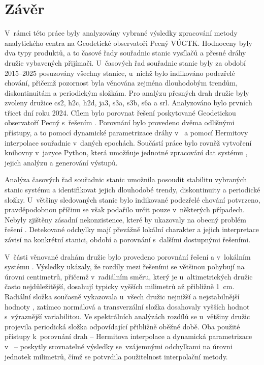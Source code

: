 \chapter{Závěr}
\label{8-zaver}

V~rámci této práce byly analyzovány vybrané výsledky zpracování metody  analytického centra na Geodetické observatoři Pecný VÚGTK. Hodnoceny byly dva typy produktů, a to časové řady souřadnic stanic vysílačů a přesné dráhy družic vybavených přijímači. U~časových řad souřadnic stanic byly za období 2015--2025 posuzovány všechny stanice, u~nichž bylo indikováno podezřelé chování, přičemž pozornost byla věnována zejména dlouhodobým trendům, diskontinuitám a periodickým složkám. Pro analýzu přesných drah družic byly zvoleny družice cs2, h2c, h2d, ja3, s3a, s3b, s6a a srl. Analyzováno bylo prvních třicet dní roku 2024. Cílem bylo porovnat řešení poskytované Geodetickou observatoří Pecný s~řešením . Porovnání bylo provedeno dvěma odlišnými přístupy, a to pomocí dynamické parametrizace dráhy v~ a pomocí Hermitovy interpolace souřadnic v~daných epochách. Součástí práce bylo rovněž vytvoření knihovny v~jazyce Python, která umožňuje jednotné zpracování dat systému , jejich analýzu a generování výstupů.

Analýza časových řad souřadnic stanic umožnila posoudit stabilitu vybraných stanic systému  a identifikovat jejich dlouhodobé trendy, diskontinuity a periodické složky. U~většiny sledovaných stanic bylo indikované podezřelé chování potvrzeno, pravděpodobnou příčinu se však podařilo určit pouze v~některých případech. Nebyly zjištěny zásadní nekonzistence, které by ukazovaly na obecný problém řešení . Detekované odchylky mají převážně lokální charakter a jejich interpretace závisí na konkrétní stanici, období a porovnání s~dalšími dostupnými řešeními.

V~části věnované drahám družic bylo provedeno porovnání řešení  a  v~lokálním systému . Výsledky ukázaly, že rozdíly mezi řešeními se většinou pohybují na úrovni centimetrů, přičemž v~radiálním směru, který je u~altimetrických družic často nejdůležitější, dosahují typicky vyšších milimetrů až přibližně 1~cm. Radiální složka současně vykazovala u~všech družic nejnižší a nejstabilnější hodnoty , zatímco normálová a transverzální složka dosahovaly vyšších hodnot s~výraznější variabilitou. Ve spektrálních analýzách rozdílů se u~většiny družic projevila periodická složka odpovídající přibližně oběžné době. Oba použité přístupy k~porovnání drah -- Hermitova interpolace a dynamická parametrizace v~ -- poskytly srovnatelné výsledky se~vzájemnými odchylkami na úrovni jednotek milimetrů, čímž se potvrdila použitelnost interpolační metody.

